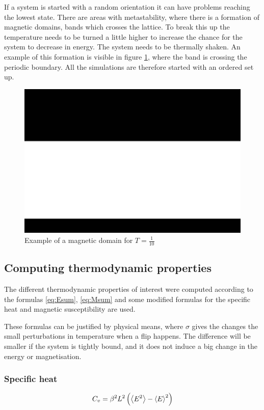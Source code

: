 \documentclass[11pt,a4paper,draft]{article}
\numberwithin{equation}{section}
\newcommand{\figurewidth}{.85\textwidth}
\begin{document}
If a system is started with a random orientation it can have problems 
reaching the lowest state. There are areas with metastability, where 
there is a formation of magnetic domains, bands which crosses the lattice.
To break this up the temperature needs to be turned a little higher to 
increase the chance for the system to decrease in energy. The system 
needs to be thermally shaken. An example of this formation is visible in 
figure \ref{fig:mag_domain}, where the band is crossing the periodic 
boundary. All the simulations are therefore started with an ordered
set up.

\begin{figure}
\centering
\includegraphics[width=\figurewidth]{pics/mag_domain.png}
\caption{Example of a magnetic domain for $T = \frac{1}{10}$}
\label{fig:mag_domain}
\end{figure}



\subsection{Computing thermodynamic properties}
The different thermodynamic properties of interest were computed 
according to the formulas \eqref{eq:Esum}, \eqref{eq:Msum} and
some modified formulas for the specific heat and magnetic susceptibility
are used.

These formulas can be justified by physical means, where $\sigma$ gives 
the changes the small perturbations in temperature when a flip happens.
The difference will be smaller if the system is tightly bound, and it 
does not induce a big change in the energy or magnetisation.

\subsubsection{Specific heat}
\begin{equation}
C_v = \beta^2L^2\left(\expval{E^2} - \expval{E}^2\right)
\end{equation}
\end{document}

